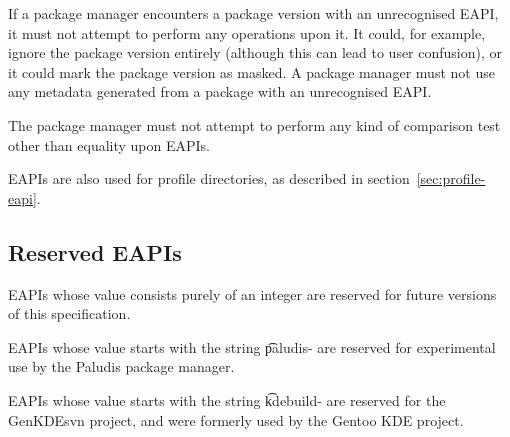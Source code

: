 If a package manager encounters a package version with an unrecognised EAPI, it must not attempt to
perform any operations upon it. It could, for example, ignore the package version entirely (although
this can lead to user confusion), or it could mark the package version as masked. A package manager
must not use any metadata generated from a package with an unrecognised EAPI.

The package manager must not attempt to perform any kind of comparison test other than equality upon
EAPIs.

EAPIs are also used for profile directories, as described in section~\ref{sec:profile-eapi}.

\subsection{Reserved EAPIs}

\begin{compactitem}
\item EAPIs whose value consists purely of an integer are reserved for future versions of this
    specification.
\item EAPIs whose value starts with the string \t{paludis-} are reserved for experimental
    use by the Paludis package manager.
\item EAPIs whose value starts with the string \t{kdebuild-} are reserved for the GenKDEsvn
    project, and were formerly used by the Gentoo KDE project.
\end{compactitem}


